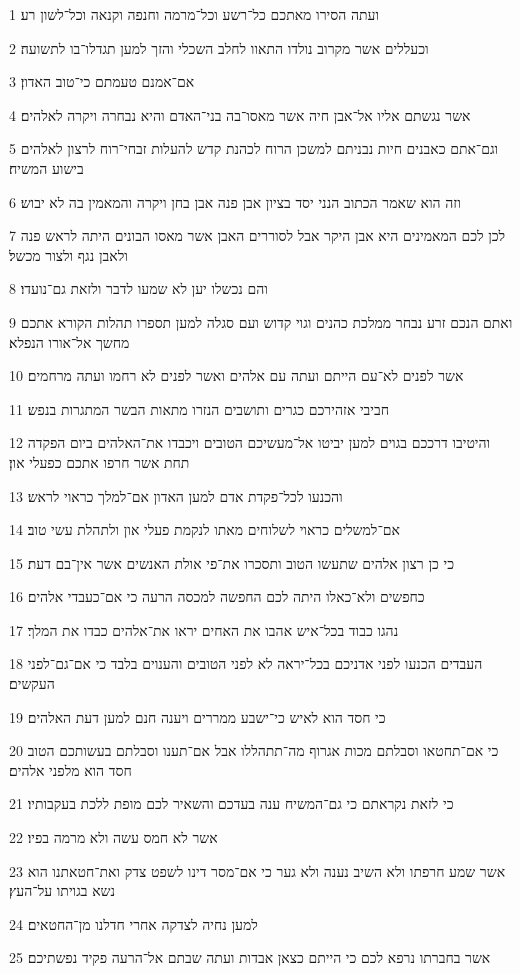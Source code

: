 \par 1 ועתה הסירו מאתכם כל־רשע וכל־מרמה וחנפה וקנאה וכל־לשון רע׃
\par 2 וכעללים אשר מקרוב נולדו התאוו לחלב השכלי והזך למען תגדלו־בו לתשועה׃
\par 3 אם־אמנם טעמתם כי־טוב האדון׃
\par 4 אשר נגשתם אליו אל־אבן חיה אשר מאסו־בה בני־האדם והיא נבחרה ויקרה לאלהים׃
\par 5 וגם־אתם כאבנים חיות נבניתם למשכן הרוח לכהנת קדש להעלות זבחי־רוח לרצון לאלהים בישוע המשיח׃
\par 6 וזה הוא שאמר הכתוב הנני יסד בציון אבן פנה אבן בחן ויקרה והמאמין בה לא יבוש׃
\par 7 לכן לכם המאמינים היא אבן היקר אבל לסוררים האבן אשר מאסו הבונים היתה לראש פנה ולאבן נגף ולצור מכשל׃
\par 8 והם נכשלו יען לא שמעו לדבר ולזאת גם־נועדו׃
\par 9 ואתם הנכם זרע נבחר ממלכת כהנים וגוי קדוש ועם סגלה למען תספרו תהלות הקורא אתכם מחשך אל־אורו הנפלא׃
\par 10 אשר לפנים לא־עם הייתם ועתה עם אלהים ואשר לפנים לא רחמו ועתה מרחמים׃
\par 11 חביבי אזהירכם כגרים ותושבים הנזרו מתאות הבשר המתגרות בנפש׃
\par 12 והיטיבו דרככם בגוים למען יביטו אל־מעשיכם הטובים ויכבדו את־האלהים ביום הפקדה תחת אשר חרפו אתכם כפעלי און׃
\par 13 והכנעו לכל־פקדת אדם למען האדון אם־למלך כראוי לראש׃
\par 14 אם־למשלים כראוי לשלוחים מאתו לנקמת פעלי און ולתהלת עשי טוב׃
\par 15 כי כן רצון אלהים שתעשו הטוב ותסכרו את־פי אולת האנשים אשר אין־בם דעת׃
\par 16 כחפשים ולא־כאלו היתה לכם החפשה למכסה הרעה כי אם־כעבדי אלהים׃
\par 17 נהגו כבוד בכל־איש אהבו את האחים יראו את־אלהים כבדו את המלך׃
\par 18 העבדים הכנעו לפני אדניכם בכל־יראה לא לפני הטובים והענוים בלבד כי אם־גם־לפני העקשים׃
\par 19 כי חסד הוא לאיש כי־ישבע ממררים ויענה חנם למען דעת האלהים׃
\par 20 כי אם־תחטאו וסבלתם מכות אגרוף מה־תתהללו אבל אם־תענו וסבלתם בעשותכם הטוב חסד הוא מלפני אלהים׃
\par 21 כי לזאת נקראתם כי גם־המשיח ענה בעדכם והשאיר לכם מופת ללכת בעקבותיו׃
\par 22 אשר לא חמס עשה ולא מרמה בפיו׃
\par 23 אשר שמע חרפתו ולא השיב נענה ולא גער כי אם־מסר דינו לשפט צדק ואת־חטאתנו הוא נשא בגויתו על־העץ׃
\par 24 למען נחיה לצדקה אחרי חדלנו מן־החטאים׃
\par 25 אשר בחברתו נרפא לכם כי הייתם כצאן אבדות ועתה שבתם אל־הרעה פקיד נפשתיכם׃

